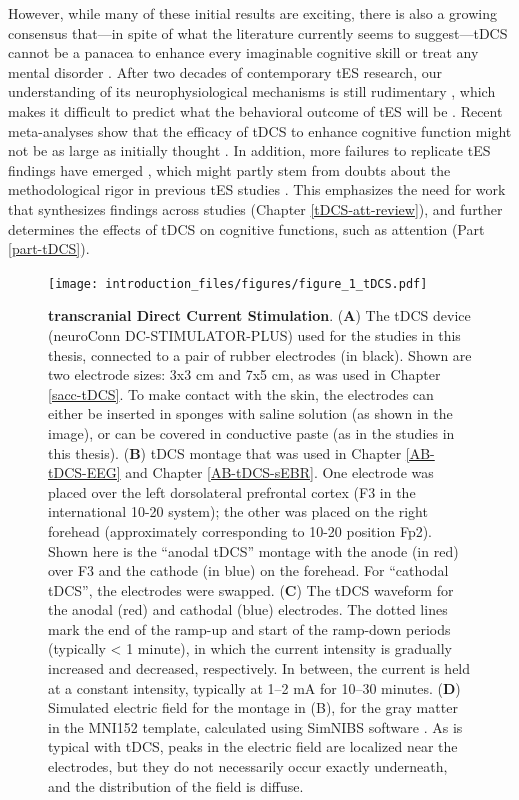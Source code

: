\documentclass[11pt,]{memoir}
\begin{document}
However, while many of these initial results are exciting, there is also a growing consensus that---in spite of what the literature currently seems to suggest---tDCS cannot be a panacea to enhance every imaginable cognitive skill or treat any mental disorder \autocites{Bestmann2017}{Parkin2015}. After two decades of contemporary tES research, our understanding of its neurophysiological mechanisms is still rudimentary \autocites{Fertonani2017}{Liu2018}, which makes it difficult to predict what the behavioral outcome of tES will be \autocites{Bestmann2014}{DeBerker2013}. Recent meta-analyses show that the efficacy of tDCS to enhance cognitive function might not be as large as initially thought \autocites{Horvath2015}{Medina2017}. In addition, more failures to replicate tES findings have emerged \autocites[e.g.,][]{Boayue2019}{Horvath2015b}{Learmonth2017}{Veniero2017}, which might partly stem from doubts about the methodological rigor in previous tES studies \autocites{Heroux2017}{Horvath2015a}{Minarik2016}. This emphasizes the need for work that synthesizes findings across studies (Chapter \ref{tDCS-att-review}), and further determines the effects of tDCS on cognitive functions, such as attention (Part \ref{part-tDCS}).

\begin{figure}
\centering
\texttt{[image: introduction\_files/figures/figure\_1\_tDCS.pdf]}
\caption{\label{fig:figure-1-tDCS}\textbf{transcranial Direct Current Stimulation}. (\textbf{A}) The tDCS device (neuroConn DC-STIMULATOR-PLUS) used for the studies in this thesis, connected to a pair of rubber electrodes (in black). Shown are two electrode sizes: 3x3 cm and 7x5 cm, as was used in Chapter \ref{sacc-tDCS}. To make contact with the skin, the electrodes can either be inserted in sponges with saline solution (as shown in the image), or can be covered in conductive paste (as in the studies in this thesis). (\textbf{B}) tDCS montage that was used in Chapter \ref{AB-tDCS-EEG} and Chapter \ref{AB-tDCS-sEBR}. One electrode was placed over the left dorsolateral prefrontal cortex (F3 in the international 10-20 system); the other was placed on the right forehead (approximately corresponding to 10-20 position Fp2). Shown here is the ``anodal tDCS'' montage with the anode (in red) over F3 and the cathode (in blue) on the forehead. For ``cathodal tDCS'', the electrodes were swapped. (\textbf{C}) The tDCS waveform for the anodal (red) and cathodal (blue) electrodes. The dotted lines mark the end of the ramp-up and start of the ramp-down periods (typically \textless{} 1 minute), in which the current intensity is gradually increased and decreased, respectively. In between, the current is held at a constant intensity, typically at 1--2 mA for 10--30 minutes. (\textbf{D}) Simulated electric field for the montage in (B), for the gray matter in the MNI152 template, calculated using SimNIBS software \autocites[Version 2.2.1;][]{Saturnino2018}{Thielscher2015}. As is typical with tDCS, peaks in the electric field are localized near the electrodes, but they do not necessarily occur exactly underneath, and the distribution of the field is diffuse.}
\end{figure}
\end{document}
